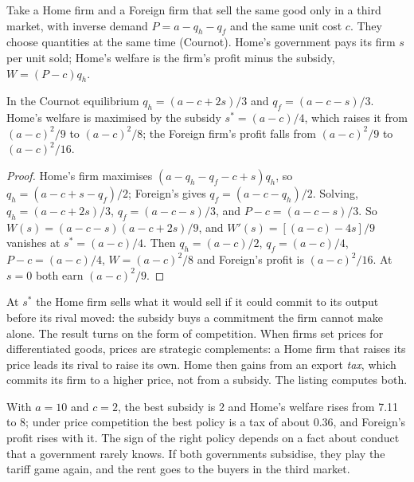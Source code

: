Take a Home firm and a Foreign firm that sell the same good only in a third
market, with inverse demand $P = a - q_h - q_f$ and the same unit cost $c$. They
choose quantities at the same time (Cournot). Home's government pays its firm $s$
per unit sold; Home's welfare is the firm's profit minus the subsidy, $W = (P - c)q_h$.

\begin{proposition}\label{prop:b3:trade-policy:bs}
In the Cournot equilibrium $q_h = (a - c + 2s)/3$ and $q_f = (a - c - s)/3$. Home's
welfare is maximised by the subsidy $s^* = (a - c)/4$, which raises it from
$(a - c)^2/9$ to $(a - c)^2/8$; the Foreign firm's profit falls from $(a - c)^2/9$ to
$(a - c)^2/16$.
\end{proposition}

\begin{proof}
Home's firm maximises $(a - q_h - q_f - c + s)q_h$, so $q_h = (a - c + s - q_f)/2$; Foreign's
gives $q_f = (a - c - q_h)/2$. Solving, $q_h = (a - c + 2s)/3$, $q_f = (a - c - s)/3$, and
$P - c = (a - c - s)/3$. So $W(s) = (a - c - s)(a - c + 2s)/9$, and $W'(s) = [(a - c) - 4s]/9$
vanishes at $s^* = (a - c)/4$. Then $q_h = (a - c)/2$, $q_f = (a - c)/4$, $P - c = (a - c)/4$,
$W = (a - c)^2/8$ and Foreign's profit is $(a - c)^2/16$. At $s = 0$ both earn $(a - c)^2/9$.
\end{proof}

At $s^*$ the Home firm sells what it would sell if it could commit to its output
before its rival moved: the subsidy buys a commitment the firm cannot make alone.
The result turns on the form of competition. When firms set prices for
differentiated goods, prices are strategic complements: a Home firm that raises
its price leads its rival to raise its own. Home then gains from an export
\emph{tax}, which commits its firm to a higher price, not from a subsidy. The listing
computes both.

\label{lst:b3:trade-policy:strategic}

\label{out:b3:trade-policy:strategic}

With $a = 10$ and $c = 2$, the best subsidy is 2 and Home's welfare rises from 7.11
to 8; under price competition the best policy is a tax of about 0.36, and Foreign's
profit rises with it. %
The sign of the right policy depends on a fact about conduct that a government
rarely knows. If both governments subsidise, they play the tariff game again, and
the rent goes to the buyers in the third market.

